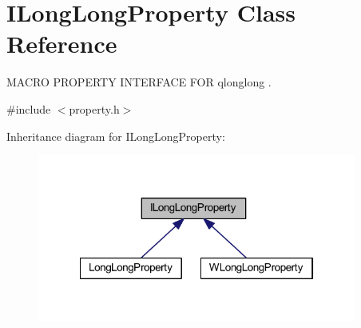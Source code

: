 \hypertarget{class_i_long_long_property}{\section{I\-Long\-Long\-Property Class Reference}
\label{class_i_long_long_property}
}


M\-A\-C\-R\-O P\-R\-O\-P\-E\-R\-T\-Y I\-N\-T\-E\-R\-F\-A\-C\-E F\-O\-R qlonglong .  




{\ttfamily \#include $<$property.\-h$>$}



Inheritance diagram for I\-Long\-Long\-Property\-:
\nopagebreak
\begin{figure}[H]
\begin{center}
\leavevmode
\includegraphics[width=297pt]{class_i_long_long_property__inherit__graph}
\end{center}
\end{figure}
